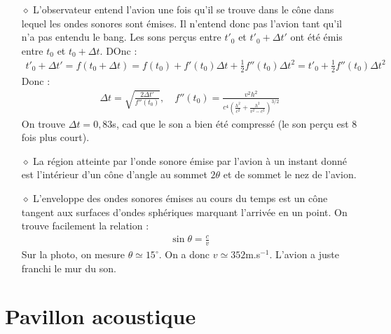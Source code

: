 \documentclass{report}
\begin{document}
\begin{itemize}
	\item[$\diamond$] L'observateur entend l'avion une fois qu'il se trouve dans le cône dans lequel les ondes sonores sont émises. Il n'entend donc pas l'avion tant qu'il n'a pas entendu le bang. Les sons perçus entre $t'_0$ et $t'_0+\Delta t'$ ont été émis entre $t_0$ et $t_0+\Delta t$. DOnc :
	\begin{align*}
		t'_0+\Delta t'=f(t_0+\Delta t)=f(t_0)+f'(t_0)\Delta t+\frac{1}{2}f''(t_0)\Delta t^2=t'_0+\frac{1}{2}f''(t_0)\Delta t^2
	\end{align*}
	Donc : 
	\begin{align*}
		\Delta t=\sqrt{\frac{2\Delta t'}{f''(t_0)}}, \quad f''(t_0)=\frac{v^2h^2}{c^4(\frac{h^2}{c^2}+\frac{h^2}{v^2-c^2})^{3/2}}
	\end{align*}
	On trouve $\Delta t=0,83$s, cad que le son a bien été compressé (le son perçu est 8 fois plus court). 
	
	\item[$\diamond$] La région atteinte par l'onde sonore émise par l'avion à un instant donné est l'intérieur d'un cône d'angle au sommet $2\theta$ et de sommet le nez de l'avion. 
	
	\item[$\diamond$] L'enveloppe des ondes sonores émises au cours du temps est un cône tangent aux surfaces d'ondes sphériques marquant l'arrivée en un point. On trouve facilement la relation :
	\begin{align*}
		\sin\theta=\frac{c}{v}
	\end{align*}
	Sur la photo, on mesure $\theta\simeq15^\circ$. On a donc $v\simeq352$m.s$^{-1}$. L'avion a juste franchi le mur du son.

\end{itemize}

\section*{Pavillon acoustique}
\end{document}
